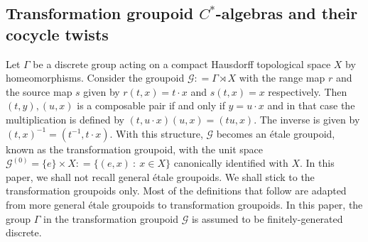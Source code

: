 \documentclass[a4paper,11pt,reqno]{amsart}
\theoremstyle{plain}
\theoremstyle{mainthmstyle}
\theoremstyle{named}
\numberwithin{equation}{section}
\begin{document}
\subsection{Transformation groupoid \texorpdfstring{$C^{\ast}$}{C*-}-algebras and their cocycle twists} 
Let $\Gamma$ be a discrete group acting on a compact Hausdorff topological space $X$ by homeomorphisms. Consider the groupoid $\mathcal G : = \Gamma \rtimes X$ with the range map $r$ and the source map $s$ given by $r(t,x) = t \cdot x$ and $s(t,x) = x$ respectively. Then $(t,y), (u,x)$ is a composable pair if and only if $y=u\cdot x$ and in that case the  multiplication is defined by $(t, u \cdot x) (u, x) = ( t u, x)$. The inverse is given by $(t, x)^{-1} = (t^{-1}, t \cdot x)$. With this structure, $\mathcal G$ becomes an étale groupoid, known as the transformation groupoid, with the unit space $\mathcal G^{(0)}=\{e\} \times X : = \{(e,x)\ :\ x \in X\}$ canonically identified with $X$. In this paper, we shall not recall general étale groupoids. We shall stick to the transformation groupoids only. Most of the definitions that follow are adapted from more general étale groupoids to transformation groupoids. In this paper, the group $\Gamma$ in the transformation groupoid $\mathcal{G}$ is assumed to be finitely-generated discrete.
\vspace{2mm}
\end{document}
